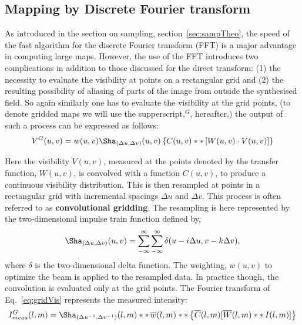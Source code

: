 \subsection{Mapping by Discrete Fourier transform}
As introduced in the section on sampling, section~\ref{sec:sampTheo}, the speed of the fast algorithm for the discrete Fourier transform (FFT) is a major advantage in computing large maps. However, the use of the FFT introduces two complications in addition to those discussed for the direct transform: (1) the necessity to evaluate the visibility at points on a rectangular grid and (2) the resulting possibility of aliasing of parts of the image from outside the synthesised field.
So again similarly one has to evaluate the visibility at the grid points, (to denote gridded maps we will use the supperscript,$^G$, hereafter,) the output of such a process can be expressed as follows: 
\begin{equation}
\label{eq:gridVis}
V^G(u,v) = w(u,v)\Sha_{(\Delta{u},\Delta{v})}(u,v)\left\lbrace{C(u,v)\ast{\ast}{\,}[W(u,v)\cdot{V(u,v)]}}\right\rbrace 
\end{equation}

Here the visibility $V(u,v)$, measured at the points denoted by the transfer function, $W(u ,v )$, is convolved with a function $C(u,v)$, to produce a continuous visibility distribution. This is then resampled at points in a rectangular grid with incremental spacings $\Delta{u}$ and $\Delta{v}$. This process is often referred to as \textbf{convolutional gridding}. The resampling is here represented by the two-dimensional impulse train function defined by,
\begin{equation}
\Sha_{(\Delta{u},\Delta{v})}(u,v) = \sum^{\infty}_{-\infty}\sum^{\infty}_{-\infty}\delta(u - i\Delta{u}, v - k\Delta{v}),
\end{equation}
where $\delta$ is the two-dimensional delta function. The weighting, $w(u,v)$ to optimize the beam is applied to the resampled data. In practice though, the convolution is evaluated only at the grid points. The Fourier transform of Eq.~\ref{eq:gridVis} represents the measured intensity:
\begin{equation}
\label{eq:gridInti}
I^{G}_{meas}(l,m) = \Sha_{(\Delta{u}^{-1},\Delta{v}^{-1})}(l,m)\ast{\ast}\,{\overline{w}(l,m)}\ast{\ast}\,{\left\lbrace{\overline{C}(l,m)[\overline{W}(l,m)\ast{\ast}{\,}{I(l,m)]}}\right\rbrace }
\end{equation}

